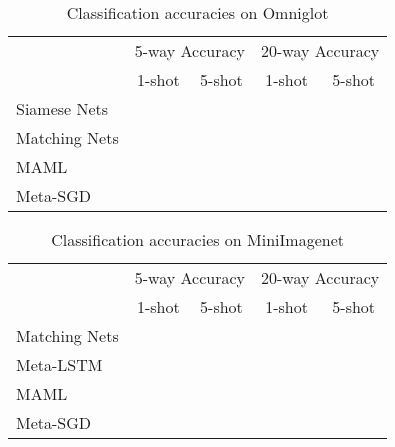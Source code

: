 \documentclass{article}
\begin{document}
\begin{table}[t]
	\centering
	\begin{center}
		\caption{Classification accuracies on Omniglot}
		\label{tab:res_omniglot}
		\vspace{0.1cm}
		\begin{tabular}{|l|c|c|c|c|}
			\hline
			\multirow{2}{*}{} & \multicolumn{2}{c|}{5-way Accuracy} & \multicolumn{2}{c|}{20-way Accuracy} \\ \cline{2-5}
			
			& 1-shot & 5-shot & 1-shot & 5-shot \\ \hline
			
			Siamese Nets &  &  &  &  \\ \hline
			
			Matching Nets &  &  &  &  \\ \hline
			
			MAML &  &  &  &  \\ \hline
			
			Meta-SGD &  &  &  &  \\ \hline
			
		\end{tabular}
	\end{center}
	\vspace{-5pt}
\end{table}


\begin{table}[t]
	\centering
	\begin{center}
		\caption{Classification accuracies on MiniImagenet}
		\label{tab:res_miniimagenet}
		\vspace{0.1cm}
		\begin{tabular}{|l|c|c|c|c|}
			\hline
			\multirow{2}{*}{} & \multicolumn{2}{c|}{5-way Accuracy} & \multicolumn{2}{c|}{20-way Accuracy} \\ \cline{2-5}
			
			& 1-shot & 5-shot & 1-shot & 5-shot \\ \hline
			
			Matching Nets &  &  &  &  \\ \hline
			
			Meta-LSTM &  &  &  &  \\ \hline
			
			MAML &  &  &  &  \\ \hline
			
			Meta-SGD &  &  &  &  \\ \hline
			
		\end{tabular}
	\end{center}
	\vspace{-5pt}
\end{table}
\end{document}
